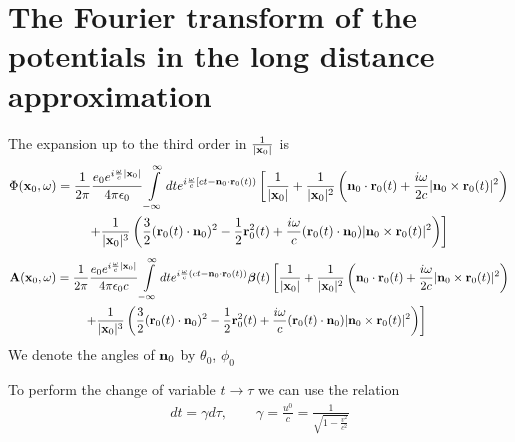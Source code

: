 \section[The Fourier transform of the potentials]{The Fourier transform of the potentials in the long distance approximation}


The expansion up to the third order in $\frac1{|{\bf x}_0|}$ is
\begin{align}
     & \Phi({\bf x}_0,\omega)=\frac1{2\pi}\frac{e_0 e^{i\frac{\omega}c|{\bf x}_0|}}{4\pi\epsilon_0}\int\limits_{-\infty}^{\infty}dte^{i\frac{\omega}c\left[ct-{\bf n}_0\cdot{\bf r}_0(t)\right)}                                     \left[\frac1{|{\bf x}_0|} +\frac1{|{\bf x}_0|^2}\left({{\bf n}_0\cdot{\bf r}_0(t)}+\frac{i\omega}{2c}{|{\bf n}_0\times{\bf r}_0(t)|^2} \right)       \right.\nonumber \\
     & \qquad \qquad \qquad \left.+\frac1{|{\bf x}_0|^3}\left(\frac32({\bf r}_0(t)
    \cdot{\bf n}_0)^2-\frac12{\bf r}^2_0(t)+\frac{i\omega}c({\bf r}_0(t)
    \cdot{\bf n}_0) |{\bf n}_0\times{\bf r}_0(t)|^2\right)     \right]\end{align}
\begin{align}
     & {\bf A}({\bf x}_0,\omega)=\frac1{2\pi}\frac{e_0 e^{i\frac{\omega}c|{\bf x}_0|}}{4\pi\epsilon_0 c}\int\limits_{-\infty}^{\infty}dte^{i\frac{\omega}c\left(ct-{\bf n}_0\cdot{\bf r}_0(t)\right)} {\boldsymbol{\beta}}(t) \left[\frac1{|{\bf x}_0|} +\frac1{|{\bf x}_0|^2}\left({{\bf n}_0\cdot{\bf r}_0(t)}+\frac{i\omega}{2c}{|{\bf n}_0\times{\bf r}_0(t)|^2} \right)       \right.\nonumber \\
     & \qquad \qquad \qquad \left.+\frac1{|{\bf x}_0|^3}\left(\frac32({\bf r}_0(t)
    \cdot{\bf n}_0)^2-\frac12{\bf r}^2_0(t)+\frac{i\omega}c({\bf r}_0(t)
    \cdot{\bf n}_0) |{\bf n}_0\times{\bf r}_0(t)|^2\right)     \right]
\end{align}
We denote the angles of ${\bf n}_0$ by $\theta_0$, $\phi_0$

To perform the change of variable $t\rightarrow\tau$ we can use the relation
\begin{align}
    dt = \gamma d\tau,\qquad \gamma = \frac{u^0}{c} = \frac1{\sqrt{1-\frac{v^2}{c^2}}}
\end{align}


